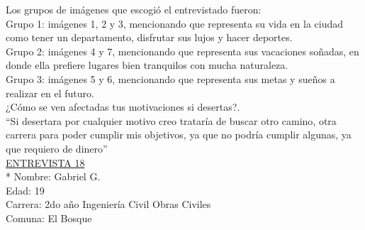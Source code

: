 Los grupos de imágenes que escogió el entrevistado fueron:\\

Grupo 1: imágenes 1, 2 y 3, mencionando que representa su vida en la ciudad como tener un departamento, disfrutar sus lujos y hacer deportes. \\

Grupo 2: imágenes 4 y 7, mencionando que representa sus vacaciones soñadas, en donde ella prefiere lugares bien tranquilos con mucha naturaleza.\\

Grupo 3: imágenes 5 y 6, mencionando que representa sus metas y sueños a realizar en el futuro.\\

¿Cómo se ven afectadas tus motivaciones si desertas?.\\

``Si desertara por cualquier motivo creo trataría de buscar otro camino, otra carrera para poder cumplir mis objetivos, ya que no podría cumplir algunas, ya que requiero de dinero''\\



\underline {ENTREVISTA 18}\\*
Nombre: Gabriel G.\\
Edad: 19\\
Carrera: 2do año Ingeniería Civil Obras Civiles \\
Comuna: El Bosque\\

